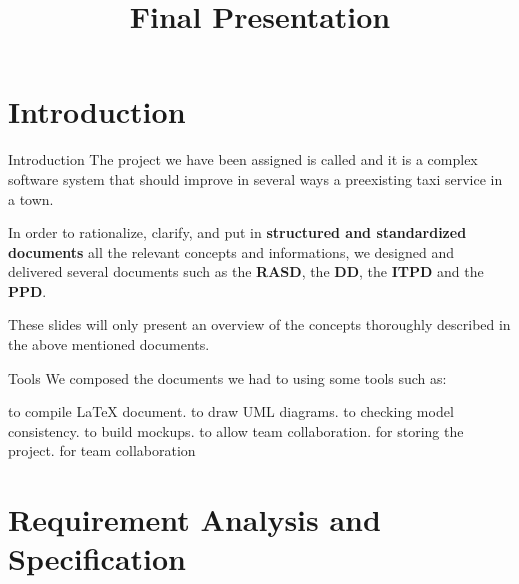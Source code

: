 \documentclass{../common/latex_classes/pdf_presentation}
\title{Final Presentation}
\begin{document}
	\titleToc{}
	\section{Introduction}
	\begin{frame}{Introduction}
		The project we have been assigned is called \myTaxiService{} and it is a complex software system that should improve in several ways a preexisting taxi service in a town.\par
		In order to rationalize, clarify, and put in \textbf{structured and standardized documents} all the relevant concepts and informations, we designed and delivered several documents such as the \textbf{RASD}, the \textbf{DD}, the \textbf{ITPD} and the \textbf{PPD}.\par
		These slides will only present an overview of the concepts thoroughly described in the above mentioned documents.
	\end{frame}
	\begin{frame}{Tools}
		We composed the documents we had to using some tools such as:
		\begin{itemize}
			 to compile \LaTeX{} document.
			 to draw UML diagrams.
			 to checking model consistency.
			 to build mockups.
			 to allow team collaboration.
			 for storing the project.
			 for team collaboration
		\end{itemize}		
	\end{frame}
	\section{Requirement Analysis and Specification}
\end{document}
